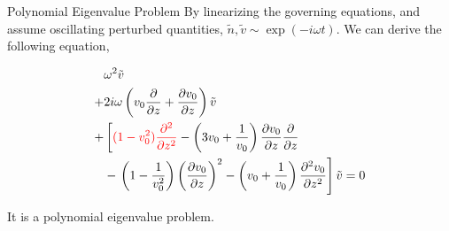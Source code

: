 \begin{frame}{Polynomial Eigenvalue Problem}
  By linearizing the governing equations, and assume oscillating perturbed quantities, $\tilde{n}, \tilde{v} \sim \exp(-i\omega t)$. We can derive the following equation,

  \begin{equation}
    \begin{aligned}
      &\omega^2 \tilde{v} \\ 
      +& 2i\omega\left(v_0\pdv{}{z} + \pdv{v_0}{z}\right) \tilde{v} \\
      +& \left[ \textcolor{red}{(1-v_0^2)\pdv[2]{}{z}} 
        -\left(3v_0 + \frac{1}{v_0}\right)\pdv{v_0}{z}\pdv{}{z} \right. \\
        &- \left. \left(1-\frac{1}{v_0^2}\right)\left(\pdv{v_0}{z}\right)^2 
      - \left(v_0+\frac{1}{v_0}\right)\pdv[2]{v_0}{z} \right]\tilde{v}
      = 0
    \end{aligned}
    \label{eq:polynomial_eigenvalue_problem}
  \end{equation}

  It is a polynomial eigenvalue problem.
\end{frame}
